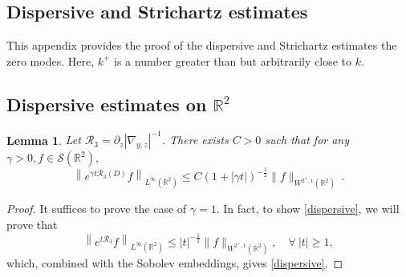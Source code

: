 \documentclass[11pt,reqno]{article}
\newcommand{\beq}{\begin{equation}}
\newcommand{\eeq}{\end{equation}}
\newtheorem{lemm}[theo]{Lemma}
\numberwithin{equation}{section}
\newcommand\R{{\mathbb R}}
\let\pa=\partial
\let\f=\frac
\begin{document}
\begin{appendices}





\section{Dispersive and Strichartz estimates}
\label{App-DS-est}

This appendix provides the proof of the dispersive and Strichartz estimates the zero modes. Here, $k^{+}$ is a number greater than but arbitrarily close to $k$.




\subsection{Dispersive estimates on \texorpdfstring{$\R^2$}{R2}}
\begin{lemm}\label{App-dis-1}
	Let $\mathcal{R}_3=\pa_z|\nabla_{y,z}|^{-1}$.
	There exists $C>0$ such that for any $\gamma>0, f\in \mathcal{S}(\R^2),$
	\beq\label{dispersive}
	\left\| e^{\gamma t\mathcal{R}_3(D)}f \right\|_{L^\infty(\mathbb{R}^2)} \leq C (1+|\gamma t|)^{-\frac{1}{2}} \|f\|_{W^{2^{+},1}(\mathbb{R}^2)}\,.
	\eeq
\end{lemm}

\begin{proof}
	It suffices to prove the case of $\gamma=1.$
	In fact, to show \eqref{dispersive},  we will prove that
	\beq\label{dispersive-1}
	\left\| e^{t\mathcal{R}_3}f \right\|_{L^\infty(\mathbb{R}^2)} \leq |t|^{-\frac{1}{2}} \|f\|_{W^{2^{+},1}(\mathbb{R}^2)}, \quad \forall~ |t|\geq 1,
	\eeq
	which, combined with the Sobolev embeddings, gives \eqref{dispersive}.
	

\end{proof}
\end{appendices}
\end{document}
